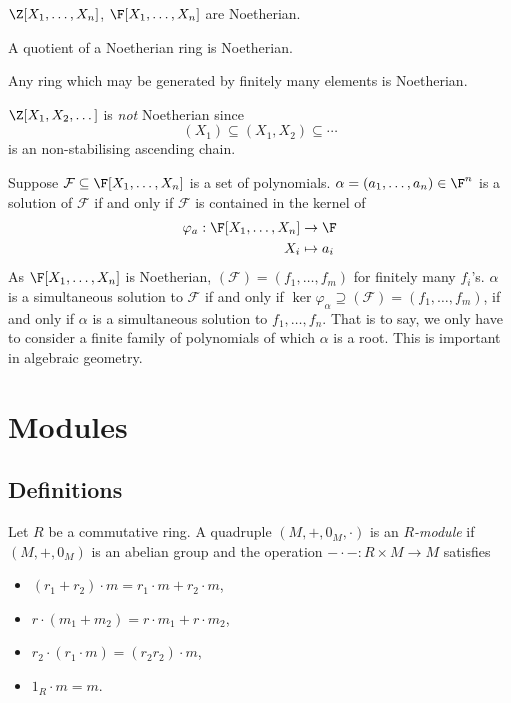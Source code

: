 \documentclass[a4paper]{article}
\theoremstyle{definition}
\begin{document}
\begin{eg}
  \(\Z[X_1, \dots, X_n]\), \(\F[X_1, \dots, X_n]\) are Noetherian.
\end{eg}

\begin{lemma}
  A quotient of a Noetherian ring is Noetherian.
\end{lemma}

\begin{corollary}
  Any ring which may be generated by finitely many elements is Noetherian.
\end{corollary}

\begin{eg}
  \(\Z[X_1, X_2, \dots]\) is \emph{not} Noetherian since
  \[
    (X_1) \subseteq (X_1, X_2) \subseteq \cdots
  \]
  is an non-stabilising ascending chain.
\end{eg}

\begin{remark}
  Suppose \(\mathcal F \subseteq \F[X_1, \dots, X_n]\) is a set of polynomials. \(\alpha = (a_1, \dots, a_n) \in \F^n\) is a solution of \(\mathcal F\) if and only if \(\mathcal F\) is contained in the kernel of
  \begin{align*}
    \varphi_a: \F[X_1, \dots, X_n] &\to \F \\
    X_i &\mapsto a_i
  \end{align*}
  As \(\F[X_1, \dots, X_n]\) is Noetherian, \((\mathcal F) = (f_1, \dots, f_m)\) for finitely many \(f_i\)'s. \(\alpha\) is a simultaneous solution to \(\mathcal F\) if and only if \(\ker \varphi_\alpha \supseteq (\mathcal F) = (f_1, \dots, f_m)\), if and only if \(\alpha\) is a simultaneous solution to \(f_1, \dots, f_n\). That is to say, we only have to consider a finite family of polynomials of which \(\alpha\) is a root. This is important in algebraic geometry.
\end{remark}

\section{Modules}

\subsection{Definitions}

\begin{definition}[Module]
  Let \(R\) be a commutative ring. A quadruple \((M, +, 0_M, \cdot)\) is an \emph{\(R\)-module} if \((M, +, 0_M)\) is an abelian group and the operation \(- \cdot -: R \times M \to M\) satisfies
  \begin{itemize}
  \item \((r_1 + r_2) \cdot m = r_1 \cdot m + r_2 \cdot m\),
  \item \(r \cdot (m_1 + m_2) = r \cdot m_1 + r \cdot m_2\),
  \item \(r_2 \cdot (r_1 \cdot m) = (r_2r_2) \cdot m\),
  \item \(1_R \cdot m = m\).
  \end{itemize}
\end{definition}
\end{document}
